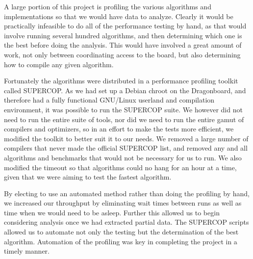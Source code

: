 A large portion of this project is profiling the various algorithms and
implementations so that we would have data to analyze. Clearly it would be
practically infeasible to do all of the performance testing by hand, as that
would involve running several hundred algorithms, and then determining which one
is the best before doing the analysis. This would have involved a great amount
of work, not only between coordinating access to the board, but also
determining how to compile any given algorithm.

Fortunately the algorithms were distributed in a performance profiling toolkit
called SUPERCOP\cite{supercop}. As we had set up a Debian chroot on the
Dragonboard, and therefore had a fully functional GNU/Linux userland and
compilation environment, it was possible to run the SUPERCOP suite. We however
did not need to run the entire suite of tools, nor did we need to run the entire
gamut of compilers and optimizers, so in an effort to make the tests more
efficient, we modified the toolkit to better suit it to our needs. We removed a
large number of compilers that never made the official SUPERCOP list, and
removed any and all algorithms and benchmarks that would not be necessary for us
to run. We also modified the timeout so that algorithms could no hang for an
hour at a time, given that we were aiming to test the fastest algorithm.

By electing to use an automated method rather than doing the profiling by hand,
we increased our throughput by eliminating wait times between runs as well as
time when we would need to be asleep. Further this allowed us to begin
considering analysis once we had extracted partial data. The SUPERCOP scripts
allowed us to automate not only the testing but the determination of the best
algorithm. Automation of the profiling was key in completing the project in a
timely manner.
